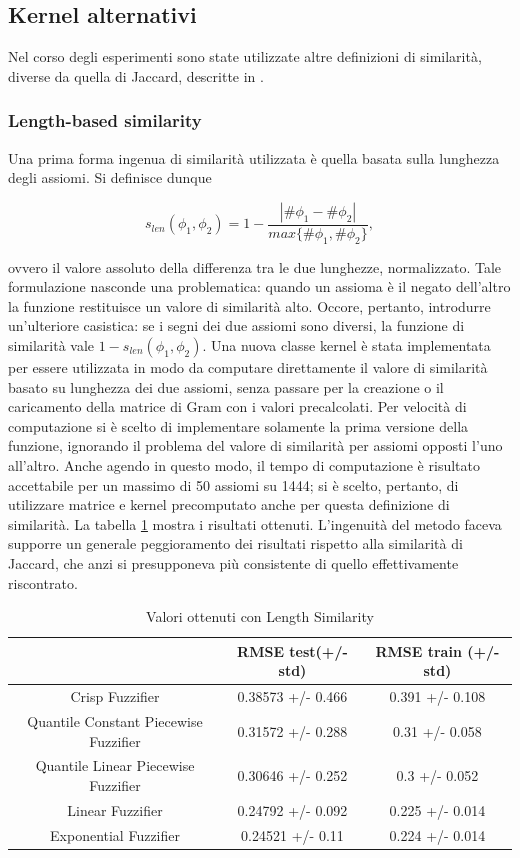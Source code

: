 \documentclass[12pt,a4paper]{report}
\begin{document}
\subsection{Kernel alternativi}
Nel corso degli esperimenti sono state utilizzate altre definizioni di similarità, diverse da quella di Jaccard, descritte in \cite{drtpaper}.
\subsubsection{Length-based similarity}
Una prima forma ingenua di similarità utilizzata è quella basata sulla lunghezza degli assiomi.
Si definisce dunque

\[ s_{len}(\phi_1, \phi_2) = 1 - \frac{|\# \phi_1 - \# \phi_2|}{max\{\#\phi_1, \#\phi_2\}},\]

ovvero il valore assoluto della differenza tra le due lunghezze, normalizzato.
Tale formulazione nasconde una problematica: quando un assioma è il negato dell'altro la funzione restituisce un valore di similarità alto. Occore, pertanto, introdurre un'ulteriore casistica: se i segni dei due assiomi sono diversi, la funzione di similarità vale $1 - s_{len}(\phi_1,\phi_2)$.
Una nuova classe kernel è stata implementata per essere utilizzata in modo da computare direttamente il valore di similarità basato su lunghezza dei due assiomi, senza passare per la creazione o il caricamento della matrice di Gram con i valori precalcolati.
Per velocità di computazione si è scelto di implementare solamente la prima versione della funzione, ignorando il problema del valore di similarità per assiomi opposti l'uno all'altro.
Anche agendo in questo modo, il tempo di computazione è risultato accettabile per un massimo di 50 assiomi su 1444; si è scelto, pertanto, di utilizzare matrice e kernel precomputato anche per questa definizione di similarità. La tabella \ref{table:risultatiLength} mostra i risultati ottenuti. L'ingenuità del metodo faceva supporre un generale peggioramento dei risultati rispetto alla similarità di Jaccard, che anzi si presupponeva più consistente di quello effettivamente riscontrato.

\begin{table}[h!]
\small
\centering 	
	\begin{tabular}{|c|c|c|} 
	 \hline
	  & RMSE test(+/- std) & RMSE train (+/- std)\\ [0.5ex] 
	 \hline
	 Crisp Fuzzifier & 0.38573 +/- 0.466 & 0.391 +/- 0.108 \\ 
	 \hline
	 Quantile Constant Piecewise Fuzzifier & 0.31572 +/- 0.288 & 0.31 +/- 0.058\\
	 \hline
	 Quantile Linear Piecewise Fuzzifier & 0.30646 +/- 0.252 & 0.3 +/- 0.052\\
	 \hline
	 Linear Fuzzifier & 0.24792 +/- 0.092 & 0.225 +/- 0.014\\
	 \hline
	 Exponential Fuzzifier & 0.24521 +/- 0.11 & 0.224 +/- 0.014\\ [1ex] 
	 \hline
	\end{tabular}
	\caption{Valori ottenuti con Length Similarity}	
	\label{table:risultatiLength}
\end{table}
\end{document}
